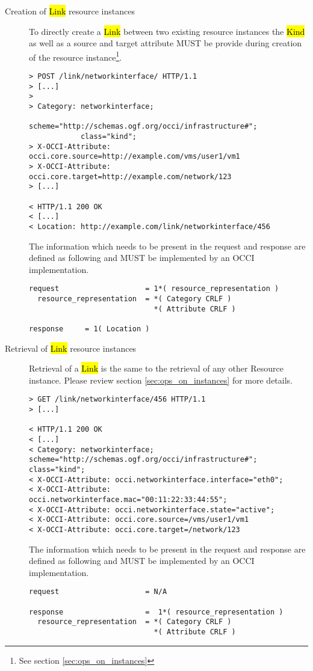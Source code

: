 \documentclass[10pt,a4paper]{article}
\begin{document}
\begin{description}
  \item[Creation of \hl{Link} resource instances] To directly create a
    \hl{Link} between two existing resource instances the \hl{Kind} as well as a
    source and target attribute MUST be provide during creation of the
    resource instance\footnote{See section \ref{sec:ops_on_instances}}.

\begin{verbatim}
> POST /link/networkinterface/ HTTP/1.1
> [...]
> 
> Category: networkinterface; 
            scheme="http://schemas.ogf.org/occi/infrastructure#"; 
            class="kind"; 
> X-OCCI-Attribute: occi.core.source=http://example.com/vms/user1/vm1
> X-OCCI-Attribute: occi.core.target=http://example.com/network/123
> [...]
 
< HTTP/1.1 200 OK
< [...]
< Location: http://example.com/link/networkinterface/456
\end{verbatim}

    The information which needs to be present in the request and
    response are defined as following and MUST be implemented by an
    OCCI implementation.

\begin{verbatim}
request                    = 1*( resource_representation )
  resource_representation  = *( Category CRLF )
                             *( Attribute CRLF )

response     = 1( Location )
\end{verbatim}

  \item[Retrieval of \hl{Link} resource instances] Retrieval of a
    \hl{Link} is the same to the retrieval of any other Resource
    instance. Please review section \ref{sec:ops_on_instances} for
    more details.

\begin{verbatim}
> GET /link/networkinterface/456 HTTP/1.1
> [...]

< HTTP/1.1 200 OK
< [...]
< Category: networkinterface; scheme="http://schemas.ogf.org/occi/infrastructure#"; class="kind";
< X-OCCI-Attribute: occi.networkinterface.interface="eth0";
< X-OCCI-Attribute: occi.networkinterface.mac="00:11:22:33:44:55";
< X-OCCI-Attribute: occi.networkinterface.state="active";
< X-OCCI-Attribute: occi.core.source=/vms/user1/vm1
< X-OCCI-Attribute: occi.core.target=/network/123
\end{verbatim}

    The information which needs to be present in the request and
    response are defined as following and MUST be implemented by an
    OCCI implementation.

\begin{verbatim}
request                    = N/A

response                   =  1*( resource_representation )
  resource_representation  = *( Category CRLF )
                             *( Attribute CRLF )
\end{verbatim}

\end{description}
\end{document}
